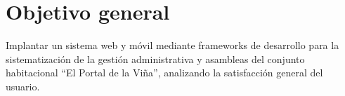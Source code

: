 \section{Objetivo general}\label{sec:objetivo-general}
Implantar un sistema web y móvil mediante frameworks de desarrollo para la sistematización de la gestión administrativa y asambleas del conjunto habitacional {\textquotedblleft}El Portal de la Viña{\textquotedblright}, analizando la satisfacción general del usuario.